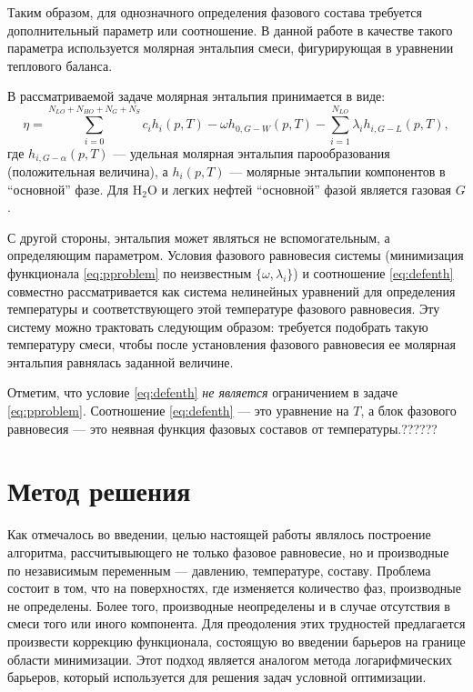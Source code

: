 ﻿\documentclass[12pt]{article}
\begin{document}
Таким образом, для однозначного определения фазового состава требуется дополнительный параметр или соотношение. В
данной работе в качестве такого параметра используется молярная энтальпия смеси, фигурирующая в уравнении теплового
баланса.

В рассматриваемой задаче молярная энтальпия принимается в виде:
\begin{equation}
\eta = \sum_{i=0}^{N_{LO}+N_{HO}+N_{G}+N_{S}} c_i h_i(p,T) -\omega h_{0,G-W}(p,T) -\sum_{i=1}^{N_{LO}} \lambda_i
h_{i,G-L}(p,T) , \label{eq:defenth}
\end{equation}
где $h_{i,G-\alpha}(p,T)$ --- удельная молярная энтальпия парообразования (положительная величина), а $h_i(p,T)$ ---
молярные энтальпии компонентов в ``основной'' фазе. Для $\mathrm{H_2O}$ и легких нефтей ``основной'' фазой является
газовая $G$.

С другой стороны, энтальпия может являться не вспомогательным, а определяющим параметром. Условия фазового равновесия
системы (минимизация функционала \eqref{eq:pproblem} по неизвестным $\{\omega, \lambda_i\}$) и соотношение
\eqref{eq:defenth} совместно рассматривается как система нелинейных уравнений для определения температуры и
соответствующего этой температуре фазового равновесия. Эту систему можно трактовать следующим образом: требуется
подобрать такую температуру смеси, чтобы после установления фазового равновесия ее молярная энтальпия равнялась
заданной величине.

Отметим, что условие \eqref{eq:defenth} \emph{не является} ограничением в задаче \eqref{eq:pproblem}. Соотношение
\eqref{eq:defenth} --- это уравнение на $T$, а блок фазового равновесия --- это неявная функция фазовых составов от
температуры.??????


\section{Метод решения}

Как отмечалось во введении, целью настоящей работы являлось построение алгоритма, рассчитывыющего не только фазовое
равновесие, но и производные по независимым переменным --- давлению, температуре, составу. Проблема состоит в том, что
на поверхностях, где изменяется количество фаз, производные не определены. Более того, производные неопределены и в
случае отсутствия в смеси того или иного компонента. Для преодоления этих трудностей предлагается произвести коррекцию
функционала, состоящую во введении барьеров на границе области минимизации. Этот подход является аналогом метода
логарифмических барьеров, который используется для решения задач условной оптимизации.
\end{document}
